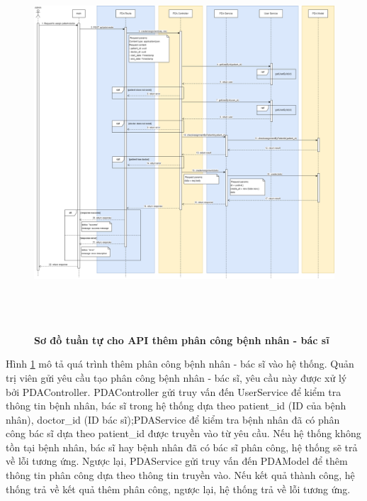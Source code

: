 \begin{figure}[H]
  \centering
  \includegraphics[width=16cm,height=14cm]{Images/sequence_api/addAssignment.png}
  \caption[Sơ đồ tuần tự cho API thêm phân công bệnh nhân - bác sĩ]{\bfseries \fontsize{12pt}{0pt}
  \selectfont Sơ đồ tuần tự cho API thêm phân công bệnh nhân - bác sĩ }
  \label{api_addPDA} %
\end{figure}
Hình \ref{api_addPDA} mô tả quá trình thêm phân công bệnh nhân - bác sĩ vào hệ thống. Quản trị viên gửi yêu cầu tạo phân công bệnh nhân - bác sĩ,  
yêu cầu này được xử lý bởi PDAController. PDAController gửi truy vấn đến UserService để kiểm tra thông tin bệnh nhân, bác sĩ trong hệ thống dựa theo patient\_id (ID của bệnh nhân), doctor\_id (ID bác sĩ);PDAService để kiểm
tra bệnh nhân đã có phân công bác sĩ dựa theo patient\_id được truyền vào từ yêu cầu. Nếu hệ thống không tồn tại bệnh nhân, bác sĩ hay bệnh nhân đã có bác sĩ phân công, hệ thống sẽ trả về lỗi tương ứng. 
Ngược lại, PDAService gửi truy vấn đến PDAModel để thêm thông tin phân công dựa theo thông tin truyền vào. Nếu kết quả thành công, hệ thống trả về kết quả thêm phân công, ngược lại, hệ thống trả về lỗi tương ứng.

